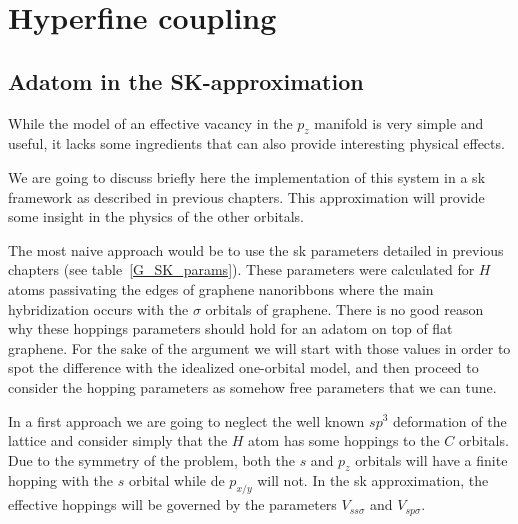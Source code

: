\chapter{Hyperfine coupling}
\section{Adatom in the SK-approximation}
While the model of an effective vacancy in the $p_z$ manifold is very simple and useful, it lacks some ingredients that can also provide interesting physical effects.

We are going to discuss briefly here the implementation of this system in a \ac{sk} framework as described in previous chapters. This approximation will provide some insight in the physics of the other orbitals.


The most naive approach would be to use the \ac{sk} parameters detailed in previous chapters (see table~\ref{G_SK_params}). These parameters were calculated for $H$ atoms passivating the edges of graphene nanoribbons\cite{Gosalbez-Martinez2011} where the main hybridization occurs with the $\sigma$ orbitals of graphene. There is no good reason why these hoppings parameters should hold for an adatom on top of flat graphene. For the sake of the argument we will start with those values in order to spot the difference with the idealized one-orbital model, and then proceed to consider the hopping parameters as somehow free parameters that we can tune.


In a first approach we are going to neglect the well known $sp^3$ deformation of the lattice\cite{} and consider simply that the $H$ atom has some hoppings to the $C$ orbitals. Due to the symmetry of the problem, both the $s$ and $p_z$ orbitals will have a finite hopping with the $s$ orbital while de $p_{x/y}$ will not. In the \ac{sk} approximation, the effective hoppings will be governed by the parameters $V_{ss\sigma}$ and $V_{sp\sigma}$.


